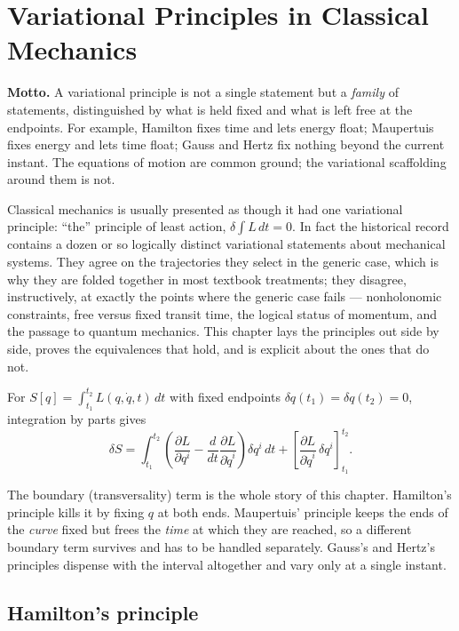 \chapter[Variational Principles]{Variational Principles in Classical Mechanics}
\label{ch:vp}

\begin{motto} \textbf{Motto.} A variational principle is not a single statement
    but a \emph{family} of statements, distinguished by what is held fixed and
    what is left free at the endpoints. For example, Hamilton fixes time and
    lets energy float; Maupertuis fixes energy and lets time float; Gauss and
    Hertz fix nothing beyond the current instant. The equations of motion are
    common ground; the variational scaffolding around them is not. 
\end{motto}

Classical mechanics is usually presented as though it had one variational
principle: ``the'' principle of least action, $\delta\!\int L\,dt = 0$. In fact
the historical record contains a dozen or so logically distinct variational
statements about mechanical systems. They agree on the trajectories they select
in the generic case, which is why they are folded together in most textbook
treatments; they disagree, instructively, at exactly the points where the
generic case fails --- nonholonomic constraints, free versus fixed transit
time, the logical status of momentum, and the passage to quantum mechanics.
This chapter lays the principles out side by side, proves the equivalences that
hold, and is explicit about the ones that do not.

For $S[q]=\int_{t_1}^{t_2} L(q,\dot q,t)\,dt$ with fixed endpoints 
$\delta q(t_1)=\delta q(t_2)=0$, integration by parts gives
\[
\delta S = \int_{t_1}^{t_2}\left(\frac{\partial L}{\partial q^i}-
\frac{d}{dt}\frac{\partial L}{\partial \dot q^i}\right)\delta q^i\,dt
+ \left[\frac{\partial L}{\partial \dot q^i}\,\delta q^i\right]_{t_1}^{t_2}.
\]

The boundary (transversality) term is the whole story of this chapter.
Hamilton's principle kills it by fixing $q$ at both ends. Maupertuis' principle
keeps the ends of the \emph{curve} fixed but frees the \emph{time} at which
they are reached, so a different boundary term survives and has to be handled
separately. Gauss's and Hertz's principles dispense with the interval
altogether and vary only at a single instant.

\section{Hamilton's principle}
\label{sec:vp-hamilton}

